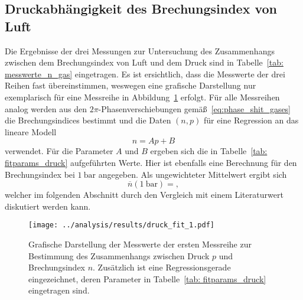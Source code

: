 

\subsection{Druckabhängigkeit des Brechungsindex von Luft}
Die Ergebnisse der drei Messungen zur Untersuchung des Zusammenhangs zwischen dem Brechungsindex von Luft und dem Druck sind in 
Tabelle~\ref{tab: messwerte_n_gas} eingetragen. Es ist ersichtlich, dass die Messwerte der drei Reihen fast übereinstimmen, weswegen eine grafische
Darstellung nur exemplarisch für eine Messreihe in Abbildung~\ref{fig: fit_druck} erfolgt. Für alle Messreihen analog werden aus 
den $2\pi$-Phasenverschiebungen gemäß~\eqref{eq:phase_shit_gases} die Brechungsindices bestimmt und die Daten $(n, p)$ für eine Regression an 
das lineare Modell
\begin{equation}
    n = A p + B
\end{equation}
verwendet. Für die Parameter $A$ und $B$ ergeben sich die in Tabelle~\ref{tab: fitparams_druck} aufgeführten Werte. Hier ist ebenfalls eine 
Berechnung für den Brechungsindex bei $\SI{1}{\bar}$ angegeben. Als ungewichteter Mittelwert ergibt sich
\begin{equation}
    \overline{n}\left(\SI{1}{\bar} \right) = ,
\end{equation}
welcher im folgenden Abschnitt durch den Vergleich mit einem Literaturwert
diskutiert werden kann. 

\begin{figure}
    \centering
    \texttt{[image: ../analysis/results/druck\_fit\_1.pdf]}
    \caption{Grafische Darstellung der Messwerte der ersten Messreihe zur Bestimmung des Zusammenhangs zwischen 
    Druck $p$ und Brechungsindex $n$. Zusätzlich ist eine Regressionsgerade eingezeichnet, deren Parameter in 
    Tabelle~\ref{tab: fitparams_druck} eingetragen sind.}
    \label{fig: fit_druck}
\end{figure}













